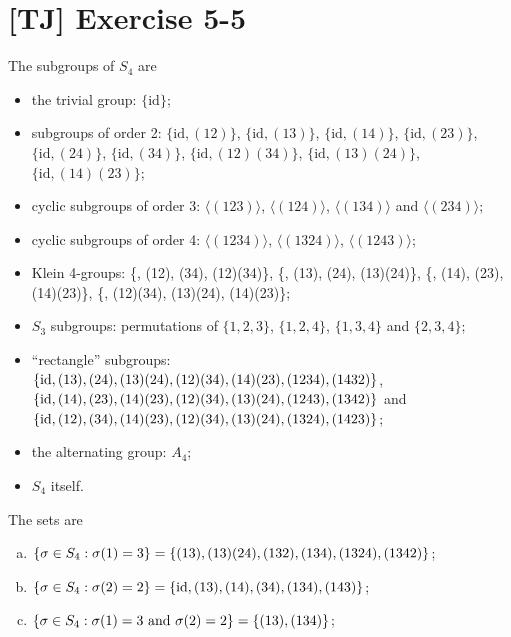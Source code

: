 \documentclass[a4paper,11pt,twocolumn]{article}
\begin{document}
  \section{[TJ] Exercise 5-5}
  The subgroups of $S_4$ are
  \begin{itemize}
    \item the trivial group: $\{\text{id}\}$;
    \item subgroups of order 2: $\{\text{id}, (12)\}$, $\{\text{id}, (13)\}$, $\{\text{id}, (14)\}$, $\{\text{id}, (23)\}$, $\{\text{id}, (24)\}$, $\{\text{id}, (34)\}$, $\{\text{id}, (12)(34)\}$, $\{\text{id}, (13)(24)\}$, $\{\text{id}, (14)(23)\}$;
    \item cyclic subgroups of order 3: $\langle (123) \rangle$, $\langle (124) \rangle$, $\langle (134) \rangle$ and $\langle (234) \rangle$;
    \item cyclic subgroups of order 4: $\langle (1234) \rangle$, $\langle (1324) \rangle$, $\langle (1243) \rangle$;
    \item Klein 4-groups: \{, (12), (34), (12)(34)\},
        \{, (13), (24), (13)(24)\},
        \{, (14), (23), (14)(23)\},
        \{, (12)(34), (13)(24), (14)(23)\};
    \item $S_3$ subgroups: permutations of $\{1, 2, 3\}$, $\{1, 2, 4\}$, $\{1, 3, 4\}$ and $\{2, 3, 4\}$;
    \item ``rectangle'' subgroups: $\{\text{id}, (13), (24),\\ (13)(24), (12)(34), (14)(23), (1234), (1432)\}$, $\{\text{id}, (14), (23), (14)(23), (12)(34), (13)(24), \\ (1243), (1342)\}$ and $\{\text{id}, (12), (34), (14)(23), \\ (12)(34), (13)(24), (1324), (1423)\}$;
    \item the alternating group: $A_4$;
    \item $S_4$ itself.
  \end{itemize}
  The sets are
  \begin{enumerate}[(a)]
    \item $\{\sigma \in S_4 : \sigma(1) = 3\} = \{(13), (13)(24), \\ (132), (134), (1324), (1342)\}$;
    \item $\{\sigma \in S_4 : \sigma(2) = 2\} = \{\text{id}, (13), (14), (34), \\ (134), (143)\}$;
    \item $\{\sigma \in S_4 : \sigma(1) = 3 \text{ and } \sigma(2) = 2\} =  \{(13), \\ (134)\}$;
  \end{enumerate}
\end{document}
